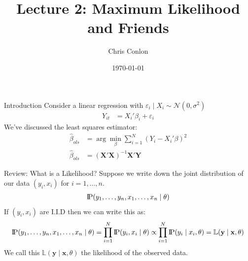 




\title{Lecture 2: Maximum Likelihood and Friends}
\author{Chris Conlon }

\newcommand{\fp}{\frame[plain]}

\date{\today}


\maketitle

\begin{frame}{Introduction}
Consider a linear regression with $\varepsilon_i \mid X_i \sim \mathcal{N}(0,\sigma^2)$
\begin{align*}
Y_{it} &= X_{i}'\beta_i + \varepsilon_{i}
\end{align*}
We've discussed the \alert{least squares estimator}:
\begin{align*}
\widehat{\beta}_{ols} &= \arg \min_{\beta} \sum_{i=1}^N (Y_i - X_i' \beta)^2\\
\widehat{\beta}_{ols} &= (\mathbf{X}'\mathbf{X})^{-1} \mathbf{X}' \mathbf{Y}
\end{align*}
\end{frame}


\begin{frame}{Review: What is a Likelihood?}
Suppose we write down the joint distribution of our data $(y_i,x_i)$ for $i=1,\ldots,n$.
\begin{align*}
\text{I\kern-0.15em P}(y_1,\ldots,y_n, x_1,\ldots,x_n \mid  \theta)
\end{align*}
If  $(y_i,x_i)$ are I.I.D then we can write this as:
\begin{align*}
 \text{I\kern-0.15em P}(y_1,\ldots,y_n, x_1,\ldots,x_n \mid \theta) = \prod_{i=1}^N \text{I\kern-0.15em P}(y_i, x_i \mid \theta) \propto \prod_{i=1}^N \text{I\kern-0.15em P}(y_i \mid x_i , \theta)=\mathbb{L}( \mathbf{y} \mid \mathbf{x} ,\theta )
\end{align*}
We call this $\mathbb{L}( \mathbf{y}\mid \mathbf{x} ,\theta )$ the \alert{likelihood} of the observed data.
\end{frame}




